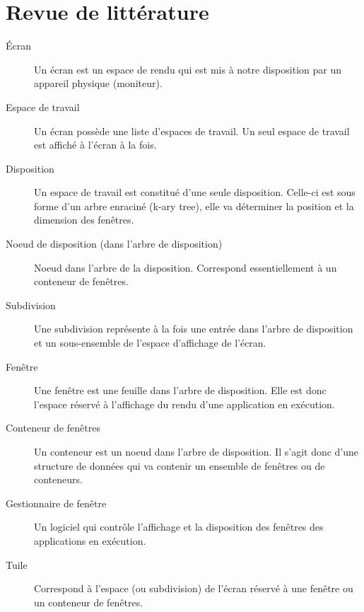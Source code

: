 \documentclass[titlepage]{article}
\begin{document}
	\section{Revue de littérature}
	\begin{description}
		\item [Écran] Un écran est un espace de rendu qui est mis à notre disposition par un appareil physique (moniteur).
		\item [Espace de travail] Un écran possède une liste d’espaces de travail. Un seul espace de travail est affiché à l’écran à la fois.
		\item [Disposition] Un espace de travail est constitué d’une seule disposition. Celle-ci est sous forme d’un arbre enraciné (k-ary tree), elle va déterminer la position et la dimension des fenêtres.
		\item [Noeud de disposition (dans l’arbre de disposition)] Noeud dans l’arbre de la disposition. Correspond essentiellement à un conteneur de fenêtres.
		\item [Subdivision] Une subdivision représente à la fois une entrée dans l’arbre de disposition et un sous-ensemble de l’espace d’affichage de l’écran.
		\item [Fenêtre] Une fenêtre est une feuille dans l’arbre de disposition. Elle est donc l’espace réservé à l’affichage du rendu d’une application en exécution.
		\item [Conteneur de fenêtres] Un conteneur est un noeud dans l’arbre de disposition. Il s’agit donc d’une structure de données qui va contenir un ensemble de fenêtres ou de conteneurs.
		\item [Gestionnaire de fenêtre] Un logiciel qui contrôle l’affichage et la disposition des fenêtres des applications en exécution.
		\item [Tuile] Correspond à l’espace (ou subdivision) de l’écran réservé à une fenêtre ou un conteneur de fenêtres.
    \end{description}
	
\end{document}
